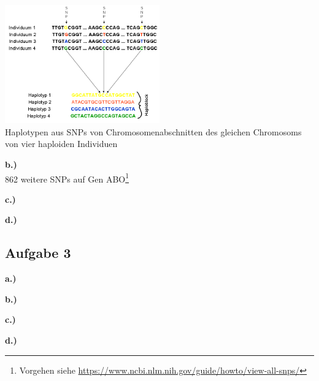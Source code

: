 \documentclass[13pt,a4paper]{article}
\begin{document}
\includegraphics[width=0.5\textwidth]{pix/exercise10/Haplotyp.PNG}\\
Haplotypen aus SNPs von Chromosomenabschnitten des gleichen Chromosoms von vier haploiden Individuen

\textbf{b.)}\\
862 weitere SNPs auf Gen ABO\footnote{Vorgehen siehe \url{https://www.ncbi.nlm.nih.gov/guide/howto/view-all-snps/}}

\textbf{c.)}

\textbf{d.)}

\subsection{Aufgabe 3}
\textbf{a.)}

\textbf{b.)}

\textbf{c.)}

\textbf{d.)}
\end{document}
